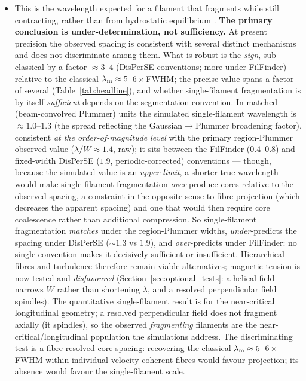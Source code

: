 \documentclass[usenatbib,twoside,twocolumn]{mnras}
\begin{document}
\begin{itemize}
\begin{itemize}
        \item This is the wavelength expected for a filament that fragments while still contracting, rather than from hydrostatic equilibrium \citep{Clarke2016}. \textbf{The primary conclusion is under-determination, not sufficiency.} At present precision the observed spacing is consistent with several distinct mechanisms and does not discriminate among them. What is robust is the \emph{sign}, sub-classical by a factor $\approx3$--$4$ (DisPerSE conventions; more under FilFinder) relative to the classical $\lambda_{\rm m}\approx5$--$6\times$FWHM; the precise value spans a factor of several (Table~\ref{tab:headline}), and whether single-filament fragmentation is by itself \emph{sufficient} depends on the segmentation convention. In matched (beam-convolved Plummer) units the simulated single-filament wavelength is $\approx1.0$--$1.3$ (the spread reflecting the Gaussian$\to$Plummer broadening factor), consistent \emph{at the order-of-magnitude level} with the primary region-Plummer observed value ($\lambda/W\approx1.4$, raw); it sits between the FilFinder ($0.4$--$0.8$) and fixed-width DisPerSE ($1.9$, periodic-corrected) conventions --- though, because the simulated value is an \emph{upper limit}, a shorter true wavelength would make single-filament fragmentation \emph{over}-produce cores relative to the observed spacing, a constraint in the opposite sense to fibre projection (which decreases the apparent spacing) and one that would then require core coalescence rather than additional compression. So single-filament fragmentation \emph{matches} under the region-Plummer widths, \emph{under}-predicts the spacing under DisPerSE ($\sim1.3$ vs $1.9$), and \emph{over}-predicts under FilFinder: no single convention makes it decisively sufficient or insufficient. Hierarchical fibres and turbulence therefore remain viable alternatives; magnetic tension is now tested and \emph{disfavoured} (Section~\ref{sec:optional_tests}: a helical field narrows $W$ rather than shortening $\lambda$, and a resolved perpendicular field spindles). The quantitative single-filament result is for the near-critical longitudinal geometry; a resolved perpendicular field does not fragment axially (it spindles), so the observed \emph{fragmenting} filaments are the near-critical/longitudinal population the simulations address. The discriminating test is a fibre-resolved core spacing: recovering the classical $\lambda_{\rm m}\approx5$--$6\times$FWHM within individual velocity-coherent fibres would favour projection; its absence would favour the single-filament scale.
    \end{itemize}


\end{itemize}
\end{document}
